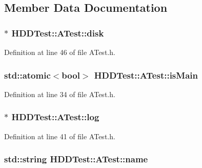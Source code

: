 \subsection{Member Data Documentation}
\hypertarget{class_h_d_d_test_1_1_a_test_a8299c80c0778b70fabcc8af49e3f0334}{
\subsubsection[{disk}]{$\ast$ H\-D\-D\-Test\-::\-A\-Test\-::disk\hspace{0.3cm}{\ttfamily [protected]}}}\label{class_h_d_d_test_1_1_a_test_a8299c80c0778b70fabcc8af49e3f0334}


Definition at line 46 of file A\-Test.\-h.

\hypertarget{class_h_d_d_test_1_1_a_test_ac32f948a2541934bba8137e20987bf71}{
\subsubsection[{is\-Main}]{\setlength{\rightskip}{0pt plus 5cm}std\-::atomic$<$bool$>$ H\-D\-D\-Test\-::\-A\-Test\-::is\-Main}}\label{class_h_d_d_test_1_1_a_test_ac32f948a2541934bba8137e20987bf71}


Definition at line 34 of file A\-Test.\-h.

\hypertarget{class_h_d_d_test_1_1_a_test_a5db6314a0231c885e25a9c98ea41e95a}{
\subsubsection[{log}]{$\ast$ H\-D\-D\-Test\-::\-A\-Test\-::log}}\label{class_h_d_d_test_1_1_a_test_a5db6314a0231c885e25a9c98ea41e95a}


Definition at line 41 of file A\-Test.\-h.

\hypertarget{class_h_d_d_test_1_1_a_test_aa7570476c8072fbbf8ec24c8f997656f}{
\subsubsection[{name}]{\setlength{\rightskip}{0pt plus 5cm}std\-::string H\-D\-D\-Test\-::\-A\-Test\-::name}}\label{class_h_d_d_test_1_1_a_test_aa7570476c8072fbbf8ec24c8f997656f}


